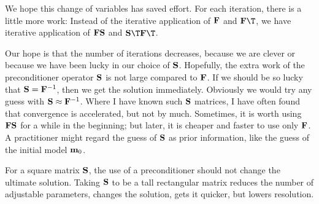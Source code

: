 \par
We hope this change of variables has saved effort.
For each iteration, there is a little more work:
Instead of the iterative application of
                                                $\bold F$ and $\bold F\T$,
we have iterative application of
                                        $\bold F\bold S$ and $\bold S\T\bold F\T$.

Our hope is that the number of iterations decreases, because we are clever
or because we have been lucky in our choice of $\bold S$.
Hopefully,
the extra work of the preconditioner operator $\bold S$
is not large compared to $\bold F$.
If we should be so lucky that
$\bold S= \bold F^{-1}$,
then we get the solution immediately.
Obviously we would try any guess with
$\bold S\approx \bold F^{-1}$.
Where I have known such $\bold S$ matrices,
I have often found that convergence is accelerated,
but not by much.
Sometimes, it is worth using $\bold F\bold S$ for a while in the beginning;
but later, it is cheaper and faster to use only $\bold F$.
A practitioner might regard the guess of $\bold S$
as prior information,
like the guess of the initial model $\bold m_0$.

\par
For a square matrix $\bold S$,
the use of a preconditioner should not change the ultimate solution.
Taking $\bold S$ to be a tall rectangular matrix
reduces the number of adjustable parameters,
changes the solution,
gets it quicker, but lowers resolution.

